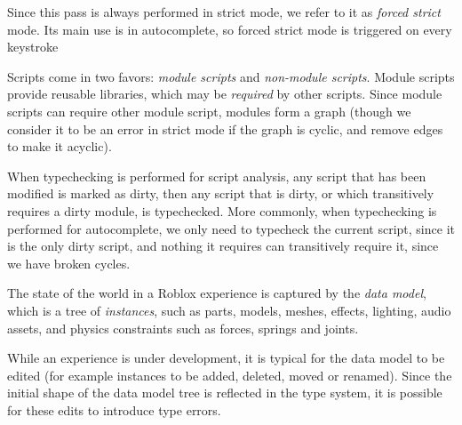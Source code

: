 \documentclass[english,submission,cleveref]{programming}
\begin{document}
Since this pass is always performed in strict mode, we refer to it as
\emph{forced strict} mode. Its main use is in autocomplete, so forced
strict mode is triggered on every keystroke

Scripts come in two favors: \emph{module scripts} and \emph{non-module
scripts}.  Module scripts provide reusable libraries, which may be
\emph{required} by other scripts. Since module scripts can require
other module script, modules form a graph (though we consider it to be
an error in strict mode if the graph is cyclic, and remove edges to
make it acyclic).

When typechecking is performed for script analysis, any script that
has been modified is marked as dirty, then any script that is dirty,
or which transitively requires a dirty module, is typechecked. More
commonly, when typechecking is performed for autocomplete, we only
need to typecheck the current script, since it is the only dirty
script, and nothing it requires can transitively require it, since we
have broken cycles.

The state of the world in a {Roblox} experience is captured by
the \emph{data model}, which is a tree of \emph{instances}, such as
parts, models, meshes, effects, lighting, audio assets, and physics
constraints such as forces, springs and joints.

While an experience is under development, it is typical for the data
model to be edited (for example instances to be added, deleted, moved
or renamed). Since the initial shape of the data model tree is reflected in
the type system, it is possible for these edits to introduce type errors.
\end{document}
